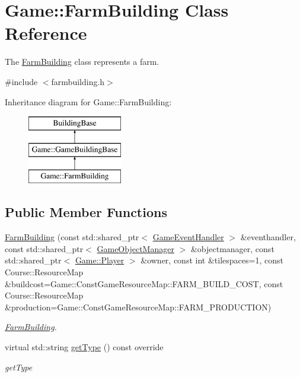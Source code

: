 \hypertarget{class_game_1_1_farm_building}{\section{Game\-:\-:Farm\-Building Class Reference}
\label{class_game_1_1_farm_building}
}


The \hyperlink{class_game_1_1_farm_building}{Farm\-Building} class represents a farm.  




{\ttfamily \#include $<$farmbuilding.\-h$>$}

Inheritance diagram for Game\-:\-:Farm\-Building\-:\begin{figure}[H]
\begin{center}
\leavevmode
\includegraphics[height=3.000000cm]{class_game_1_1_farm_building}
\end{center}
\end{figure}
\subsection*{Public Member Functions}
\begin{DoxyCompactItemize}
\item 
\hyperlink{class_game_1_1_farm_building_a2930230dbb5607e285ce583fb29addbd}{Farm\-Building} (const std\-::shared\-\_\-ptr$<$ \hyperlink{class_game_1_1_game_event_handler}{Game\-Event\-Handler} $>$ \&eventhandler, const std\-::shared\-\_\-ptr$<$ \hyperlink{class_game_1_1_game_object_manager}{Game\-Object\-Manager} $>$ \&objectmanager, const std\-::shared\-\_\-ptr$<$ \hyperlink{class_game_1_1_player}{Game\-::\-Player} $>$ \&owner, const int \&tilespaces=1, const Course\-::\-Resource\-Map \&buildcost=Game\-::\-Const\-Game\-Resource\-Map\-::\-F\-A\-R\-M\-\_\-\-B\-U\-I\-L\-D\-\_\-\-C\-O\-S\-T, const Course\-::\-Resource\-Map \&production=Game\-::\-Const\-Game\-Resource\-Map\-::\-F\-A\-R\-M\-\_\-\-P\-R\-O\-D\-U\-C\-T\-I\-O\-N)
\begin{DoxyCompactList}\small\item\em \hyperlink{class_game_1_1_farm_building}{Farm\-Building}. \end{DoxyCompactList}\item 
virtual std\-::string \hyperlink{class_game_1_1_farm_building_af251d750c5350eb4295535e81b4b3890}{get\-Type} () const override
\begin{DoxyCompactList}\small\item\em get\-Type \end{DoxyCompactList}\end{DoxyCompactItemize}
